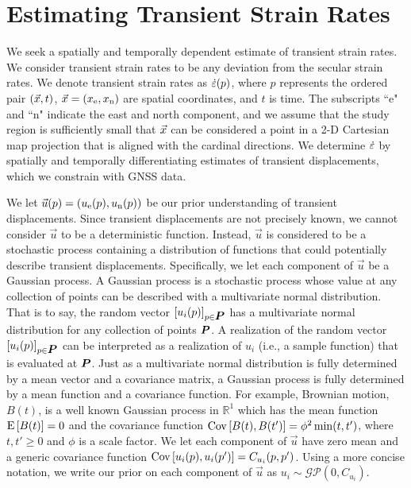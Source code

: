 \documentclass[extra,mreferee]{gji}
\begin{document}
\section{Estimating Transient Strain Rates}\label{sec:Method}


We seek a spatially and temporally dependent estimate of transient
strain rates. We consider transient strain rates to be any deviation
from the secular strain rates. We denote transient strain rates as
$\dot\varepsilon(p)$, where $p$ represents the ordered pair $(\vec{x},t)$, $\vec{x}
= (x_{\mathrm{e}},x_{\mathrm{n}})$ are spatial coordinates, and $t$ is time. The
subscripts ``e" and ``n" indicate the east and north component, and we
assume that the study region is sufficiently small that $\vec{x}$ can be
considered a point in a 2-D Cartesian map projection that is aligned
with the cardinal directions. We determine $\dot\varepsilon$ by spatially and
temporally differentiating estimates of transient displacements, which
we constrain with GNSS data.


We let $\vec{u}(p) = (u_{\mathrm{e}}(p),u_{\mathrm{n}}(p))$ be our prior understanding of
transient displacements. Since transient displacements are not
precisely known, we cannot consider $\vec{u}$ to be a deterministic
function. Instead, $\vec{u}$ is considered to be a stochastic process
containing a distribution of functions that could potentially describe
transient displacements. Specifically, we let each component of
$\vec{u}$ be a Gaussian process. A Gaussian process is a stochastic
process whose value at any collection of points can be described with
a multivariate normal distribution. That is to say, the random vector
$[u_i(p)]_{p \in \points}$ has a multivariate normal distribution for
any collection of points $\points$. A realization of the random vector
$[u_i(p)]_{p \in \points}$ can be interpreted as a realization of
$u_i$ (i.e., a sample function) that is evaluated at $\points$. Just
as a multivariate normal distribution is fully determined by a mean
vector and a covariance matrix, a Gaussian process is fully determined
by a mean function and a covariance function. For example, Brownian
motion, $B(t)$, is a well known Gaussian process in $\mathbb{R}^1$
which has the mean function $\mathrm{E}\left[ B(t) \right] = 0$ and the covariance function
$\mathrm{Cov}\left[ B(t),B(t') \right] = \phi^2 \min(t,t')$, where $t,t' \ge 0$ and $\phi$
is a scale factor. We let each component of $\vec{u}$ have zero
mean and a generic covariance function $\mathrm{Cov}\left[ u_i(p),u_i(p') \right] =
C_{u_i}(p,p')$. Using a more concise notation, we write our prior on
each component of $\vec{u}$ as $u_i \sim
\mathcal{GP}\left(0,C_{u_i}\right)$.
\end{document}
